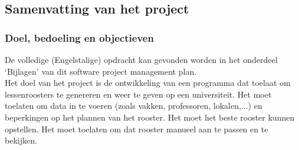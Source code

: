 \documentclass{article}
\begin{document}

\subsection{Samenvatting van het project}

\subsubsection{Doel, bedoeling en objectieven}




De volledige (Engelstalige) opdracht kan gevonden worden in het onderdeel `Bijlagen' van dit software project management plan.\\[3mm]

Het doel van het project is de ontwikkeling van een programma dat toelaat om lessenroosters te genereren en weer te geven op een universiteit. Het moet toelaten om data in te voeren (zoals vakken, professoren, lokalen,...) en beperkingen op het plannen van het rooster. Het moet het beste rooster kunnen opstellen. Het moet toelaten om dat rooster manueel aan te passen en te bekijken.
\end{document}
